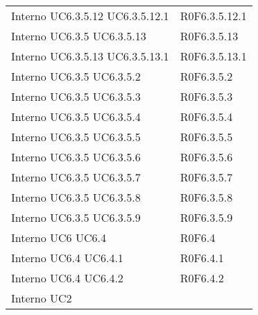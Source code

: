 \begin{longtable}{p{2.5cm}!{\VRule[1pt]}p{2.5cm}}
Interno \newline UC6.3.5.12
 \newline UC6.3.5.12.1
 & R0F6.3.5.12.1 \\
Interno \newline UC6.3.5
 \newline UC6.3.5.13
 & R0F6.3.5.13 \\
Interno \newline UC6.3.5.13
 \newline UC6.3.5.13.1
 & R0F6.3.5.13.1 \\
Interno \newline UC6.3.5
 \newline UC6.3.5.2
 & R0F6.3.5.2 \\
Interno \newline UC6.3.5
 \newline UC6.3.5.3
 & R0F6.3.5.3 \\
Interno \newline UC6.3.5
 \newline UC6.3.5.4
 & R0F6.3.5.4 \\
Interno \newline UC6.3.5
 \newline UC6.3.5.5
 & R0F6.3.5.5 \\
Interno \newline UC6.3.5
 \newline UC6.3.5.6
 & R0F6.3.5.6 \\
Interno \newline UC6.3.5
 \newline UC6.3.5.7
 & R0F6.3.5.7 \\
Interno \newline UC6.3.5
 \newline UC6.3.5.8
 & R0F6.3.5.8 \\
Interno \newline UC6.3.5
 \newline UC6.3.5.9
 & R0F6.3.5.9 \\
Interno \newline UC6
 \newline UC6.4
 & R0F6.4 \\
Interno \newline UC6.4
 \newline UC6.4.1
 & R0F6.4.1 \\
Interno \newline UC6.4
 \newline UC6.4.2
 & R0F6.4.2 \\
Interno \newline UC2

\end{longtable}
